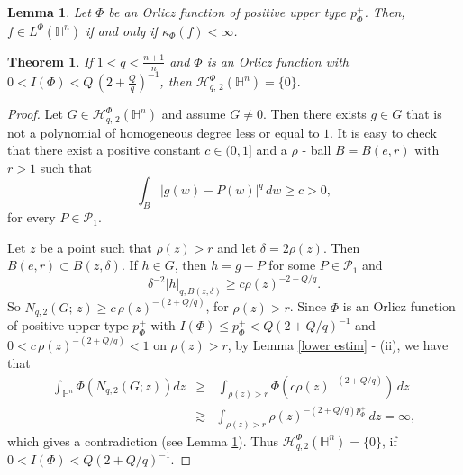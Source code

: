 \documentclass[10pt,a4paper]{amsart}
\newtheorem{lemma}{Lemma}
\newtheorem{theorem}{Theorem}
\begin{document}
\begin{lemma} \label{modular 1}
Let $\Phi$ be an Orlicz function of positive upper type $p_{\Phi}^{+}$. Then, $f \in L^{\Phi}(\mathbb{H}^n)$ if and only if 
$\kappa_{\Phi}(f) < \infty$.
\end{lemma}

\begin{theorem} \label{2nd thm}
If $1 < q < \frac{n+1}{n}$ and $\Phi$ is an Orlicz function with $0 < I(\Phi) < Q \, (2 + \frac{Q}{q})^{-1}$, then 
$\mathcal{H}^{\Phi}_{q, \, 2}(\mathbb{H}^{n}) = \{ 0 \}.$
\end{theorem}

\begin{proof} Let $G \in \mathcal{H}^{\Phi}_{q, \, 2}(\mathbb{H}^{n})$ and assume $G \neq 0$. Then there exists $g \in G$ 
that is not a polynomial of homogeneous degree less or equal to $1$. It is easy to check that there exist a positive constant 
$c \in (0, 1]$ and a $\rho$ - ball $B = B(e, r)$ with $r > 1$ such that
\[
\int_{B} |g(w) - P(w)|^{q} \, dw \geq c > 0,
\]
for every $P \in \mathcal{P}_{1}$.

Let $z$ be a point such that $\rho(z) > r$ and let $\delta = 2 \rho(z)$. Then $B(e, r) \subset B(z, \delta)$. If $h \in G$, then 
$h = g - P$ for some $P \in \mathcal{P}_{1}$ and
\[
\delta^{-2}|h|_{q, B(z, \delta)} \geq c \rho(z)^{-2-Q/q}.
\]
So $N_{q,2}(G; \, z) \geq c \, \rho(z)^{-(2+Q/q)}$, for $\rho(z) > r$. Since $\Phi$ is an Orlicz function of positive upper type 
$p_{\Phi}^{+}$ with $I(\Phi) \leq p_{\Phi}^{+} < Q(2+Q/q)^{-1}$ and $0 < c \, \rho(z)^{-(2+Q/q)} < 1$ on $\rho(z) > r$, by 
Lemma \ref{lower estim} - (ii), we have that
\begin{eqnarray*}
\int_{\mathbb{H}^n} \Phi\left( N_{q,2}(G; z) \right) dz &\geq& \, \int_{\rho(z) > r} \Phi\left( c \rho(z)^{-(2+Q/q)} \right) \, dz \\
&\gtrsim& \int_{\rho(z) > r} \rho(z)^{-(2+Q/q)p^{+}_{\Phi}} \, dz = \infty,
\end{eqnarray*}
which gives a contradiction (see Lemma \ref{modular 1}). Thus $\mathcal{H}^{\Phi}_{q, 2}(\mathbb{H}^{n}) = \{0\}$, 
if $0 < I(\Phi) < Q(2+Q/q)^{-1}$.
\end{proof}
\end{document}
